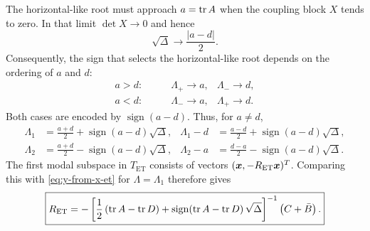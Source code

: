 The horizontal-like root must approach $a=\operatorname{tr} A$ when the coupling block
$X$ tends to zero.  In that limit $\det X\to0$ and hence
\begin{equation}
 \sqrt{\Delta}\longrightarrow\frac{|a-d|}{2}.
 \label{eq:et-uncoupled-discriminant}
\end{equation}
Consequently, the sign that selects the horizontal-like root depends on
the ordering of $a$ and $d$:
\begin{equation}
 \begin{aligned}
  a>d:&\qquad \Lambda_+\longrightarrow a,
                    &\Lambda_-\longrightarrow d,\\
  a<d:&\qquad \Lambda_-\longrightarrow a,
                    &\Lambda_+\longrightarrow d.
 \end{aligned}
 \label{eq:et-uncoupled-root-selection}
\end{equation}
Both cases are encoded by $\operatorname{sign}(a-d)$.  Thus, for $a\ne d$,
\begin{equation}
 \begin{aligned}
  \Lambda_1
  &=\frac{a+d}{2}
    +\operatorname{sign}(a-d)\sqrt{\Delta},
  &\Lambda_1-d
  &=\frac{a-d}{2}
    +\operatorname{sign}(a-d)\sqrt{\Delta},\\
  \Lambda_2
  &=\frac{a+d}{2}
    -\operatorname{sign}(a-d)\sqrt{\Delta},
  &\Lambda_2-a
  &=\frac{d-a}{2}
    -\operatorname{sign}(a-d)\sqrt{\Delta}.
 \end{aligned}
 \label{eq:horizontal-et-root}
\end{equation}
The first modal subspace in $T_{\mathrm{ET}}$ consists of vectors
$(\bm{x},-R_{\mathrm{ET}}\bm{x})^T$.  Comparing this with
\cref{eq:y-from-x-et} for $\Lambda=\Lambda_1$ therefore gives
\begin{equation}
 \boxed{
 R_{\mathrm{ET}}
 =-\left[
  \frac12\left(\operatorname{tr} A-\operatorname{tr} D\right)
  +\operatorname{sign}\!\left(\operatorname{tr} A-\operatorname{tr} D\right)\sqrt{\Delta}
 \right]^{-1}
 \left(C+\bar B\right).
 }
 \label{eq:ret-from-map-blocks}
\end{equation}

